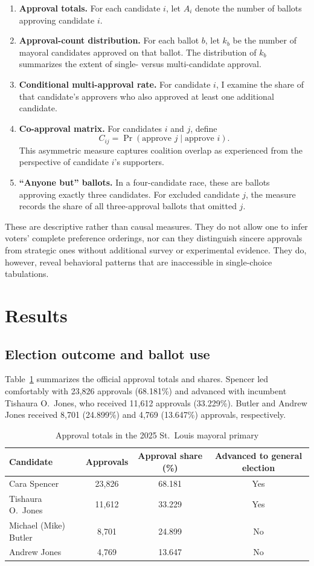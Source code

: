 \documentclass[11pt]{article}
\begin{document}
\begin{enumerate}[leftmargin=1.5em]
    \item \textbf{Approval totals.} For each candidate $i$, let $A_i$ denote the number of ballots approving candidate $i$.
    \item \textbf{Approval-count distribution.} For each ballot $b$, let $k_b$ be the number of mayoral candidates approved on that ballot. The distribution of $k_b$ summarizes the extent of single- versus multi-candidate approval.
    \item \textbf{Conditional multi-approval rate.} For candidate $i$, I examine the share of that candidate's approvers who also approved at least one additional candidate.
    \item \textbf{Co-approval matrix.} For candidates $i$ and $j$, define
    \[
        C_{ij} = \Pr(\text{approve } j \mid \text{approve } i).
    \]
    This asymmetric measure captures coalition overlap as experienced from the perspective of candidate $i$'s supporters.
    \item \textbf{``Anyone but'' ballots.} In a four-candidate race, these are ballots approving exactly three candidates. For excluded candidate $j$, the measure records the share of all three-approval ballots that omitted $j$.
\end{enumerate}

These are descriptive rather than causal measures. They do not allow one to infer voters' complete preference orderings, nor can they distinguish sincere approvals from strategic ones without additional survey or experimental evidence. They do, however, reveal behavioral patterns that are inaccessible in single-choice tabulations.

\section{Results}
\subsection{Election outcome and ballot use}
Table~\ref{tab:results} summarizes the official approval totals and shares. Spencer led comfortably with 23,826 approvals (68.181\%) and advanced with incumbent Tishaura O.~Jones, who received 11,612 approvals (33.229\%). Butler and Andrew Jones received 8,701 (24.899\%) and 4,769 (13.647\%) approvals, respectively.

\begin{table}[htbp]
\centering
\caption{Approval totals in the 2025 St.~Louis mayoral primary}
\label{tab:results}
\begin{tabular}{lccc}
\toprule
Candidate & Approvals & Approval share (\%) & Advanced to general election \\
\midrule
Cara Spencer & 23,826 & 68.181 & Yes \\
Tishaura O.~Jones & 11,612 & 33.229 & Yes \\
Michael (Mike) Butler & 8,701 & 24.899 & No \\
Andrew Jones & 4,769 & 13.647 & No \\
\bottomrule
\end{tabular}
\end{table}
\end{document}
